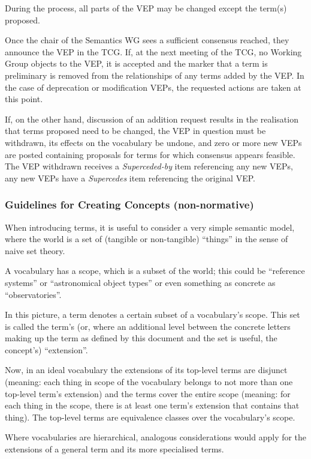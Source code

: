 \documentclass[11pt,a4paper]{ivoa}
\newcommand{\vepitem}[1]{\emph{#1}}
\begin{document}
During the process, all parts of the VEP may be changed except the
term(s) proposed.

Once the chair of the Semantics WG sees a sufficient consensus reached,
they announce the VEP in the TCG.  If, at the next meeting of the TCG,
no Working Group objects to the VEP, it is accepted and the marker that
a term is preliminary is removed from the relationships of any terms
added by the VEP.  In the case of deprecation or modification VEPs, the
requested actions are taken at this point.

If, on the other hand, discussion of an addition request results in the
realisation that terms proposed need to be changed, the VEP in question
must be withdrawn, its effects on the vocabulary be undone, and zero or
more new VEPs are posted containing proposals for terms for which
consensus appears feasible.  The VEP withdrawn receives a
\vepitem{Superceded-by} item referencing any new VEPs, any new VEPs have
a \vepitem{Supercedes} item referencing the original VEP.

\subsubsection{Guidelines for Creating Concepts (non-normative)}

When introducing terms, it is useful to consider a very simple
semantic model, where the world is a set of (tangible or non-tangible)
``things'' in the sense of naive set theory.

A vocabulary has a scope, which is a subset of the world; this could be
``reference systems'' or ``astronomical object types'' or even something
as concrete as ``observatories''.

In this picture, a term denotes a certain subset of a vocabulary's
scope.  This set is called the term's (or, where an additional level
between the concrete letters making up the term as defined by this
document and the set is useful, the concept's) ``extension''.

Now, in an ideal vocabulary the extensions of its
top-level terms are disjunct (meaning: each thing in scope of the vocabulary
belongs to not more than one top-level term's extension) and the terms cover the
entire scope (meaning: for each thing in the scope, there is at least
one term's extension that contains that thing). The top-level terms are
equivalence classes over the vocabulary's scope.

Where vocabularies are hierarchical, analogous considerations would
apply for the extensions of a general term and its more specialised
terms.
\end{document}
